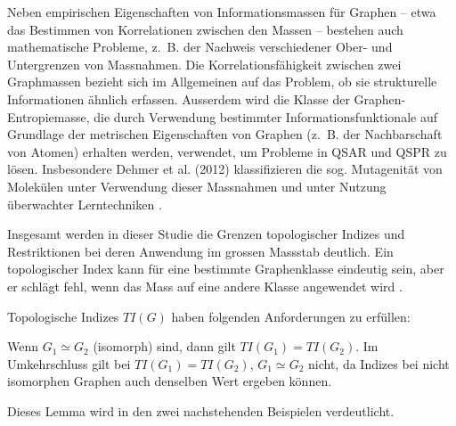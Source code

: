 Neben empirischen Eigenschaften von Informationsmassen für Graphen – etwa das Bestimmen von Korrelationen zwischen den Massen – bestehen auch mathematische Probleme, z. B. der Nachweis verschiedener Ober- und Untergrenzen von Massnahmen.
Die Korrelationsfähigkeit zwischen zwei Graphmassen bezieht sich im Allgemeinen auf das Problem, ob sie strukturelle Informationen ähnlich erfassen.
Ausserdem wird die Klasse der Graphen-Entropiemasse, die durch Verwendung bestimmter Informationsfunktionale auf Grundlage der metrischen Eigenschaften von Graphen (z. B. der Nachbarschaft von Atomen) erhalten werden, verwendet, um Probleme in QSAR und QSPR zu lösen.
Insbesondere Dehmer et al. (2012) klassifizieren die sog. Mutagenität von Molekülen unter Verwendung dieser Massnahmen und unter Nutzung überwachter Lerntechniken \cite[p.~2]{dehmer_information_2012}.

Insgesamt werden in dieser Studie die Grenzen topologischer Indizes und Restriktionen bei deren Anwendung im grossen Massstab deutlich. Ein topologischer Index kann für eine bestimmte Graphenklasse eindeutig sein, aber er schlägt fehl, wenn das Mass auf eine andere Klasse angewendet wird \cite[p.~9]{dehmer_information_2012}.

Topologische Indizes \(TI(G)\) haben folgenden Anforderungen zu erfüllen:

\begin{lemma}
    \label{thm:index_isomorphism}%
    Wenn \(G_1 \simeq G_2 \) (isomorph) sind, dann gilt \(TI(G_1) = TI(G_2)\).
    Im Umkehrschluss gilt bei \(TI(G_1) = TI(G_2)\), \( G_1 \simeq G_2\) nicht, da Indizes bei nicht isomorphen Graphen auch denselben Wert ergeben können.
\end{lemma}

Dieses Lemma wird in den zwei nachstehenden Beispielen verdeutlicht.

